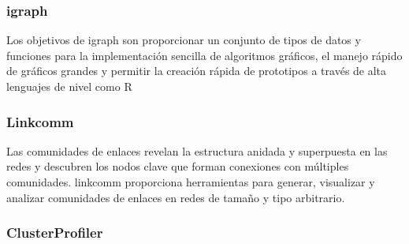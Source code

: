 \subsubsection{igraph}

Los objetivos de igraph son proporcionar un conjunto de tipos de datos y funciones para la implementación sencilla de algoritmos gráficos, el manejo rápido de gráficos grandes y permitir la creación rápida de prototipos a través de alta lenguajes de nivel como R

\subsubsection{Linkcomm}

Las comunidades de enlaces revelan la estructura anidada y superpuesta en las redes y descubren los nodos clave que forman conexiones con múltiples comunidades. linkcomm \cite{Linkcomm_paper} proporciona herramientas para generar, visualizar y analizar comunidades de enlaces en redes de tamaño y tipo arbitrario.

\subsubsection{ClusterProfiler}





\hfill




\newpage
